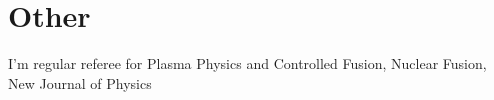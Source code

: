 \section{Other}
I'm regular referee for Plasma Physics and Controlled Fusion, Nuclear
Fusion, New Journal of Physics 
